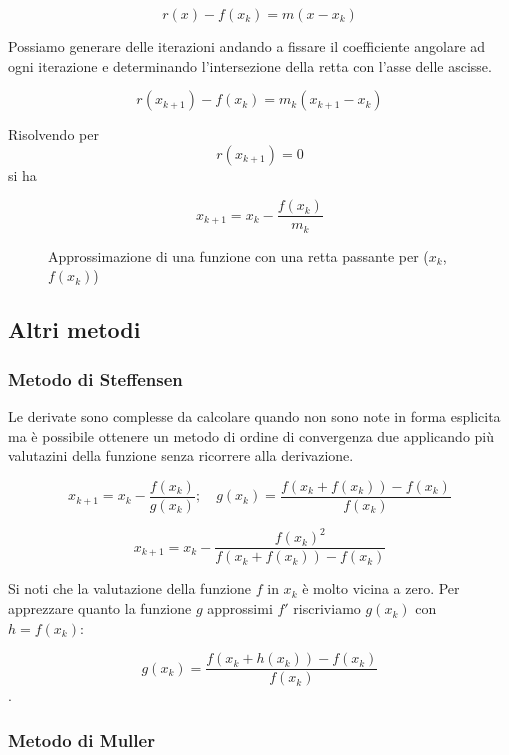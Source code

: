 \documentclass[12pt]{article}
\theoremstyle{plain}%
\theoremstyle{definition}
\theoremstyle{remark}
\begin{document}
$$r(x) - f(x_k) = m (x - x_k)$$

Possiamo generare delle iterazioni andando a fissare il coefficiente angolare ad ogni iterazione e determinando l'intersezione della retta con l'asse delle ascisse.

$$r(x_{k+1}) - f(x_k) = m_k (x_{k+1} - x_k)$$

Risolvendo per $$r(x_{k+1}) = 0$$ si ha

\begin{equation}
    x_{k+1} = x_k - \frac{f(x_k)}{m_k}
\end{equation}

\begin{figure}
    \begin{center}
        
        \caption{Approssimazione di una funzione con una retta passante per ($x_k$, $f(x_k)$)}
        \label{fig:retta_approx}
    \end{center}
\end{figure}







\subsection{Altri metodi}

\subsubsection{Metodo di Steffensen}

Le derivate sono complesse da calcolare quando non sono
note in forma esplicita ma è possibile ottenere un metodo
di ordine di convergenza due applicando più valutazini della funzione
senza ricorrere alla derivazione.

$$x_{k+1} = x_k -\frac{f(x_k)}{g(x_k)};\quad g(x_k) =\frac{f(x_k + f(x_k )) - f(x_k )}{f(x_k)}$$

$$x_{k+1} = x_k - \frac{f(x_k)^2}{f(x_k + f(x_k )) - f(x_k )}$$

Si noti che la valutazione della funzione $f$ in $x_k$ è molto vicina a zero.
Per apprezzare quanto la funzione $g$ approssimi $f'$ riscriviamo $g(x_k)$ con
$h = f(x_k)$:

$$g(x_k) =\frac{f(x_k + h(x_k )) - f(x_k )}{f(x_k)}$$.

\subsubsection{Metodo di Muller}
\end{document}
